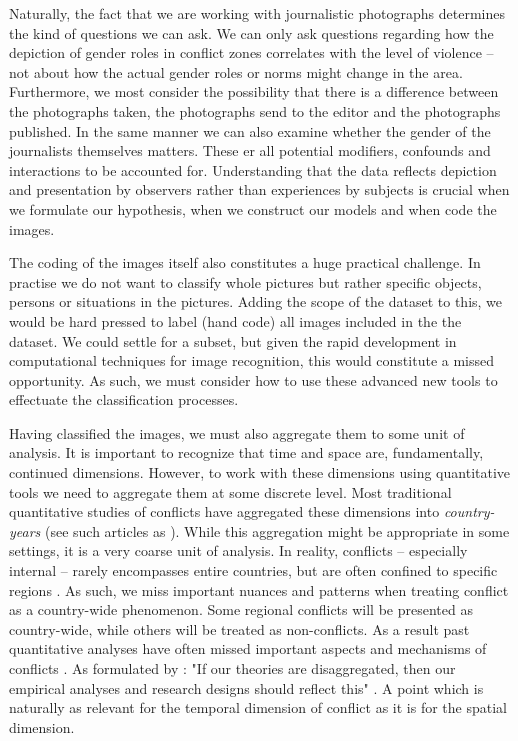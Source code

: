 \documentclass[a4paper]{article}
\begin{document}
Naturally, the fact that we are working with journalistic photographs determines the kind of questions we can ask. We can only ask questions regarding how the depiction of gender roles in conflict zones correlates with the level of violence -- not about how the actual gender roles or norms might change in the area. Furthermore, we most consider the possibility that there is a difference between the photographs taken, the photographs send to the editor and the photographs published. In the same manner we can also examine whether the gender of the journalists themselves matters. These er all potential modifiers, confounds and interactions to be accounted for. Understanding that the data reflects depiction and presentation by observers rather than experiences by subjects is crucial when we formulate our hypothesis, when we construct our models and when code the images.\par

The coding of the images itself also constitutes a huge practical challenge. In practise we do not want to classify whole pictures but rather specific objects, persons or situations in the pictures. Adding the scope of the dataset to this, we would be hard pressed to label (hand code) all images included in the the dataset. We could settle for a subset, but given the rapid development in computational techniques for image recognition, this would constitute a missed opportunity. As such, we must consider how to use these advanced new tools to effectuate the classification processes.\par 
Having classified the images, we must also aggregate them to some unit of analysis. It is important to recognize that time and space are, fundamentally, continued dimensions. However, to work with these dimensions using quantitative tools we need to aggregate them at some discrete level. Most traditional quantitative studies of conflicts have aggregated these dimensions into \emph{country-years} (see such articles as \cite{Collier_Hoeffler_1998, Fearon_Laitin_2003, Collier_Hoeffler_2004, Fearon_2004, Ross_2004, Fearon_2005, Hegre_Sambanis_2006, Goldstone_2010}). While this aggregation might be appropriate in some settings, it is a very coarse unit of analysis. In reality, conflicts -- especially internal -- rarely encompasses entire countries, but are often confined to specific regions \citep[487]{Cederman_Gleditsch_2009}. As such, we miss important nuances and patterns when treating conflict as a country-wide phenomenon. Some regional conflicts will be presented as country-wide, while others will be treated as non-conflicts. As a result past quantitative analyses have often missed important aspects and mechanisms of conflicts \citep{Cederman_Gleditsch_2009, Cederman_Gleditsch_Buhaug_2013}. As formulated by \cite{Cederman_Gleditsch_2009}: "If our theories are disaggregated, then our empirical analyses and research designs should reflect this" \citep[490]{Cederman_Gleditsch_2009}. A point which is naturally as relevant for the temporal dimension of conflict as it is for the spatial dimension.\par 
\end{document}
